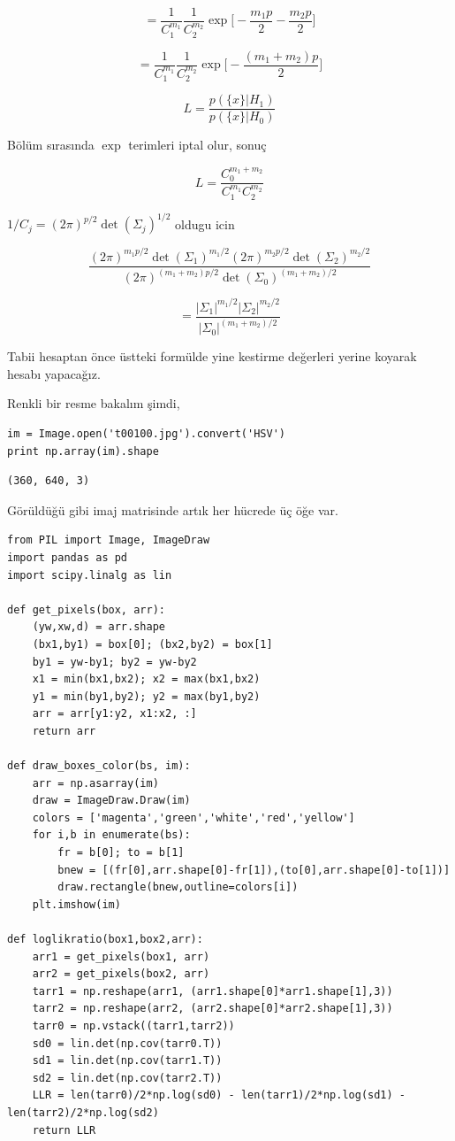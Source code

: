 \documentclass[12pt,fleqn]{article}\usepackage{../../common}
\begin{document}
$$ =
\frac{1}{C_1^{m_1}}\frac{1}{C_2^{m_2}}
\exp\bigg[-\frac{m_1 p}{2} -\frac{m_2 p}{2}\bigg]
$$

$$ =
\frac{1}{C_1^{m_1}}\frac{1}{C_2^{m_2}} \exp\bigg[- \frac{(m_1+m_2) p}{2}\bigg]
$$

$$ L = \frac{p(\{x\}|H_1)}{p(\{x\}|H_0)} $$

Bölüm sırasında $\exp$ terimleri iptal olur, sonuç

$$ L = \frac{C_0^{m_1+m_2}}{C_1^{m_1}C_2^{m_2}  } $$

$1/C_j = (2\pi)^{p/2} \det(\Sigma_j)^{1/2} $ oldugu icin

$$
\frac{
  (2\pi)^{m_1 p/2} \det(\Sigma_1)^{m_1/2}
  (2\pi)^{m_2 p/2} \det(\Sigma_2)^{m_2/2}
}
{(2\pi)^{(m_1+m_2) p/2} \det(\Sigma_0)^{(m_1+m_2)/2} }
$$

$$= \frac { |\Sigma_1|^{m_1/2}  |\Sigma_2|^{m_2/2} }{ |\Sigma_0|^{(m_1+m_2)/2} }$$

Tabii hesaptan önce üstteki formülde yine kestirme değerleri yerine koyarak
hesabı yapacağız.

Renkli bir resme bakalım şimdi,

\begin{verbatim}
im = Image.open('t00100.jpg').convert('HSV')
print np.array(im).shape
\end{verbatim}

\begin{verbatim}
(360, 640, 3)
\end{verbatim}

Görüldüğü gibi imaj matrisinde artık her hücrede üç öğe var.

\begin{verbatim}
from PIL import Image, ImageDraw
import pandas as pd
import scipy.linalg as lin

def get_pixels(box, arr):
    (yw,xw,d) = arr.shape
    (bx1,by1) = box[0]; (bx2,by2) = box[1]
    by1 = yw-by1; by2 = yw-by2
    x1 = min(bx1,bx2); x2 = max(bx1,bx2)
    y1 = min(by1,by2); y2 = max(by1,by2)
    arr = arr[y1:y2, x1:x2, :]
    return arr

def draw_boxes_color(bs, im):
    arr = np.asarray(im)
    draw = ImageDraw.Draw(im)
    colors = ['magenta','green','white','red','yellow']
    for i,b in enumerate(bs):
        fr = b[0]; to = b[1]
        bnew = [(fr[0],arr.shape[0]-fr[1]),(to[0],arr.shape[0]-to[1])]
        draw.rectangle(bnew,outline=colors[i])
    plt.imshow(im)
    
def loglikratio(box1,box2,arr):
    arr1 = get_pixels(box1, arr)
    arr2 = get_pixels(box2, arr)
    tarr1 = np.reshape(arr1, (arr1.shape[0]*arr1.shape[1],3))
    tarr2 = np.reshape(arr2, (arr2.shape[0]*arr2.shape[1],3))
    tarr0 = np.vstack((tarr1,tarr2))
    sd0 = lin.det(np.cov(tarr0.T))
    sd1 = lin.det(np.cov(tarr1.T))
    sd2 = lin.det(np.cov(tarr2.T))
    LLR = len(tarr0)/2*np.log(sd0) - len(tarr1)/2*np.log(sd1) - len(tarr2)/2*np.log(sd2)
    return LLR
\end{verbatim}
\end{document}
